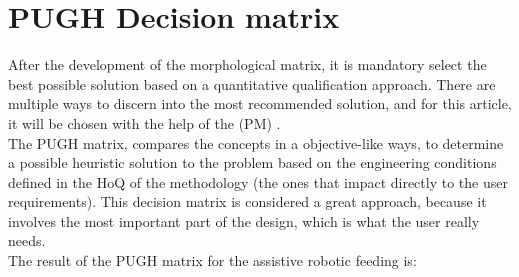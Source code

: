 \documentclass[11pt]{report} %
\begin{document}
\section{PUGH Decision matrix}

After the development of the morphological matrix, it is mandatory select the best possible solution based on a quantitative qualification approach. There are multiple ways to discern into the most recommended solution, and for this article, it will be chosen with the help of the  (PM) \citep{cite_pugh_matrix}.\\

The PUGH matrix, compares the concepts in a objective-like ways, to determine a possible heuristic solution to the problem based on the engineering conditions defined in the HoQ of the methodology (the ones that impact directly to the user requirements). This decision matrix is considered a great approach, because it involves the most important part of the design, which is what the user really needs.\\

The result of the PUGH matrix for the assistive robotic feeding is:\\
\end{document}
